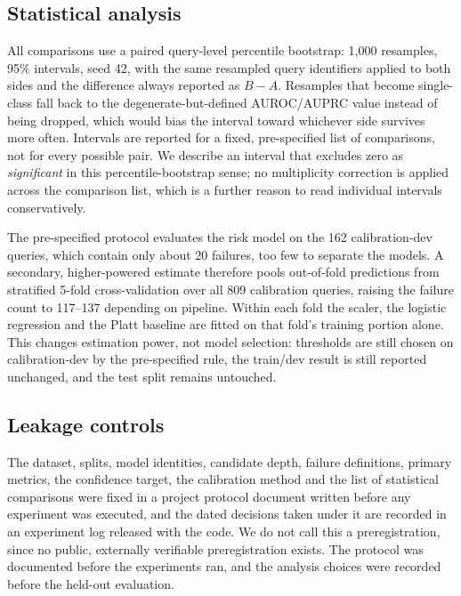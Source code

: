 \documentclass[11pt,a4paper]{article}
\begin{document}
\subsection{Statistical analysis}
\label{sec:stats}

All comparisons use a paired query-level percentile bootstrap: 1{,}000 resamples, 95\%
intervals, seed 42, with the same resampled query identifiers applied to both sides and the
difference always reported as $B - A$. Resamples that become single-class fall back to the
degenerate-but-defined AUROC/AUPRC value instead of being dropped, which would bias the
interval toward whichever side survives more often. Intervals are reported for a fixed,
pre-specified list of comparisons, not for every possible pair. We describe an interval
that excludes zero as \emph{significant} in this percentile-bootstrap sense; no multiplicity
correction is applied across the comparison list, which is a further reason to read individual
intervals conservatively.

The pre-specified protocol evaluates the risk model on the 162 calibration-dev queries, which
contain only about 20 failures, too few to separate the models. A secondary, higher-powered
estimate therefore pools out-of-fold predictions from stratified 5-fold cross-validation over
all 809 calibration queries, raising the failure count to 117--137 depending on pipeline.
Within each fold the scaler, the logistic regression and the Platt baseline are fitted on that
fold's training portion alone. This changes estimation power, not model selection: thresholds
are still chosen on calibration-dev by the pre-specified rule, the train/dev result is still
reported unchanged, and the test split remains untouched.

\subsection{Leakage controls}
\label{sec:leakage}

The dataset, splits, model identities, candidate depth, failure definitions, primary metrics,
the confidence target, the calibration method and the list of statistical comparisons were fixed
in a project protocol document written before any experiment was executed, and the dated
decisions taken under it are recorded in an experiment log released with the code. We do not
call this a preregistration, since no public, externally verifiable preregistration exists. The
protocol was documented before the experiments ran, and the analysis choices were recorded
before the held-out evaluation.
\end{document}

